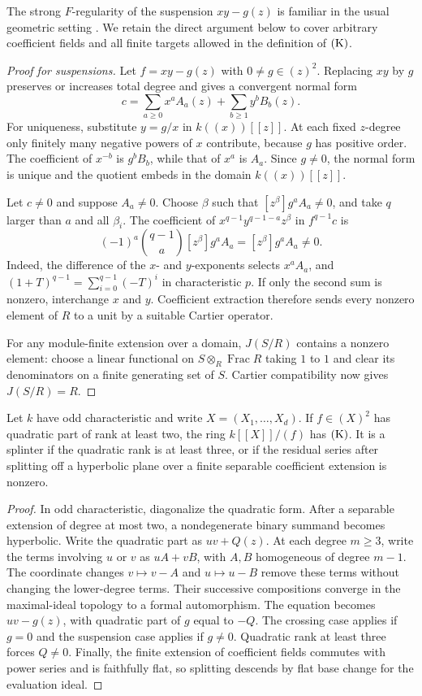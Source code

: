 The strong $F$-regularity of the suspension $xy-g(z)$ is familiar in the
usual geometric setting \cite[p.~5]{HP2017}.  We retain the direct argument below to
cover arbitrary coefficient fields and all finite targets allowed in the
definition of $\mathrm{(K)}$.

\begin{proof}[Proof for suspensions]
Let $f=xy-g(z)$ with $0\ne g\in(z)^2$.  Replacing $xy$ by $g$ preserves
or increases total degree and gives a convergent normal form
\[
 c=\sum_{a\ge0}x^a A_a(z)+\sum_{b\ge1}y^b B_b(z).
\]
For uniqueness, substitute $y=g/x$ in $k((x))[[z]]$.  At each fixed
$z$-degree only finitely many negative powers of $x$ contribute, because
$g$ has positive order.  The coefficient of $x^{-b}$ is $g^bB_b$, while
that of $x^a$ is $A_a$.  Since $g\ne0$, the normal form is unique and the
quotient embeds in the domain $k((x))[[z]]$.

Let $c\ne0$ and suppose $A_a\ne0$.  Choose $\beta$ such that
$[z^\beta]g^aA_a\ne0$, and take $q$ larger than $a$ and all $\beta_i$.
The coefficient of $x^{q-1}y^{q-1-a}z^\beta$ in $f^{q-1}c$ is
\[
 (-1)^a\binom{q-1}{a}[z^\beta]g^aA_a
   =[z^\beta]g^aA_a\ne0.
\]
Indeed, the difference of the $x$- and $y$-exponents selects
$x^aA_a$, and
$(1+T)^{q-1}=\sum_{i=0}^{q-1}(-T)^i$ in characteristic $p$.
If only the second sum is nonzero, interchange $x$ and $y$.
Coefficient extraction therefore sends every nonzero element of $R$
to a unit by a suitable Cartier operator.

For any module-finite extension over a domain, $J(S/R)$ contains a nonzero
element: choose a linear functional on $S\otimes_R\operatorname{Frac}R$
taking $1$ to $1$ and clear its denominators on a finite generating set
of $S$.  Cartier compatibility now gives $J(S/R)=R$.
\end{proof}
\begin{corollary}\label{quadratic-rank}
Let $k$ have odd characteristic and write $X=(X_1,\ldots,X_d)$. If $f\in(X)^2$ has quadratic part of rank at least two, the ring $k[[X]]/(f)$ has $\mathrm{(K)}$.
It is a splinter if the quadratic rank is at least three, or if the residual series after splitting off a hyperbolic plane over a finite separable coefficient extension is nonzero.
\end{corollary}
\begin{proof}
In odd characteristic, diagonalize the quadratic form.  After a separable
extension of degree at most two, a nondegenerate binary summand becomes
hyperbolic.  Write the quadratic part as $uv+Q(z)$.
At each degree $m\ge3$, write the terms involving $u$ or $v$ as
$uA+vB$, with $A,B$ homogeneous of degree $m-1$.  The coordinate changes
$v\mapsto v-A$ and $u\mapsto u-B$ remove these terms without changing
the lower-degree terms.  Their successive compositions converge in the
maximal-ideal topology to a formal automorphism.  The equation becomes
$uv-g(z)$, with quadratic part of $g$ equal to $-Q$.
The crossing case applies if $g=0$ and the suspension case applies if $g\ne0$.
Quadratic rank at least three forces $Q\ne0$.  Finally, the finite
extension of coefficient fields commutes with power series and is
faithfully flat, so splitting descends by flat base change for the evaluation ideal.
\end{proof}

